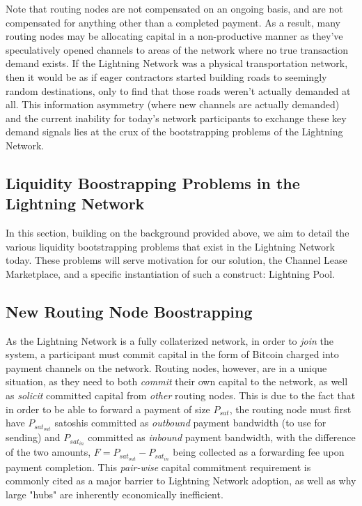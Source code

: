 \documentclass[10pt,a4paper]{article}
\theoremstyle{definition}
\begin{document}
 Note that routing nodes are not compensated on an ongoing basis, and are not
 compensated for anything other than a completed payment. As a result, many
 routing nodes may be allocating capital in a non-productive manner
 \cite{avivCharge} as they've speculatively opened channels to areas of the
 network where no true transaction demand exists. If the Lightning Network was
 a physical transportation network, then it would be as if eager contractors
 started building roads to seemingly random destinations, only to find that
 those roads weren't actually demanded at all. This information asymmetry
 (where new channels are actually demanded) and the current inability for
 today's network participants to exchange these key demand signals lies at the
 crux of the bootstrapping problems of the Lightning Network.

\subsection{Liquidity Boostrapping Problems in the Lightning Network}

In this section, building on the background provided above, we aim to detail
the various liquidity bootstrapping problems that exist in the Lightning
Network today.  These problems will serve motivation for our solution, the
Channel Lease Marketplace, and a specific instantiation of such a construct:
Lightning Pool.


\subsection{New Routing Node Boostrapping}

As the Lightning Network is a fully collaterized network, in order to
\emph{join} the system, a participant must commit capital in the form of
Bitcoin charged into payment channels on the network. Routing nodes, however, are
in a unique situation, as they need to both \emph{commit} their own capital to
the network, as well as \emph{solicit} committed capital from \emph{other}
routing nodes. This is due to the fact that in order to be able to forward a
payment of size $P_{sat}$, the routing node must first have $P_{sat_{out}}$
satoshis committed as \emph{outbound} payment bandwidth (to use for sending)
and $P_{sat_{in}}$ committed as \emph{inbound} payment bandwidth, with the
difference of the two amounts, $F= P_{sat_{out}} -  P_{sat_{in}}$ being collected
as a forwarding fee upon payment completion. This \emph{pair-wise} capital
commitment requirement is commonly cited as a major barrier to Lightning
Network adoption, as well as why large "hubs" are inherently
economically inefficient.
\end{document}
